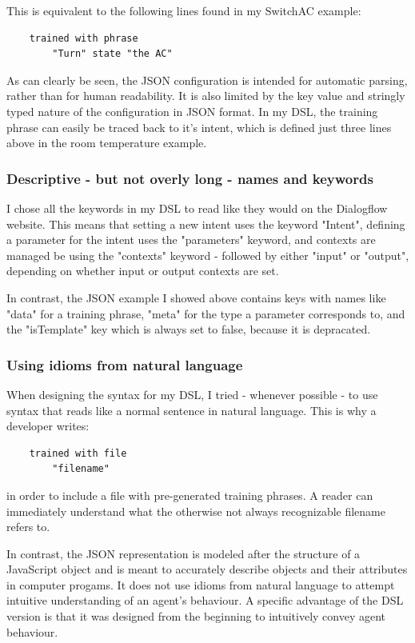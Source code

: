 This is equivalent to the following lines found in my SwitchAC example:
\begin{verbatim}
    trained with phrase
        "Turn" state "the AC"
\end{verbatim}
As can clearly be seen, the JSON configuration is intended for automatic parsing, rather than for human readability. It is also limited by the key value and stringly typed nature of the configuration in JSON format. In my DSL, the training phrase can easily be traced back to it's intent, which is defined just three lines above in the room temperature example.

\subsubsection{Descriptive - but not overly long - names and keywords}

I chose all the keywords in my DSL to read like they would on the Dialogflow website.
This means that setting a new intent uses the keyword "Intent", defining a parameter for the intent uses the "parameters" keyword, and contexts are managed be using the "contexts" keyword - followed by either "input" or "output", depending on whether input or output contexts are set.

In contrast, the JSON example I showed above contains keys with names like "data" for a training phrase, "meta" for the type a parameter corresponds to, and the "isTemplate" key which is always set to false, because it is depracated.

\subsubsection{Using idioms from natural language}

When designing the syntax for my DSL, I tried - whenever possible - to use syntax that reads like a normal sentence in natural language. This is why a developer writes: 
\begin{verbatim}
    trained with file
        "filename"
\end{verbatim}
in order to include a file with pre-generated training phrases. A reader can immediately understand what the otherwise not always recognizable filename refers to.

In contrast, the JSON representation is modeled after the structure of a JavaScript object and is meant to accurately describe objects and their attributes in computer progams. It does not use idioms from natural language to attempt intuitive understanding of an agent's behaviour.
A specific advantage of the DSL version is that it was designed from the beginning to intuitively convey agent behaviour.

